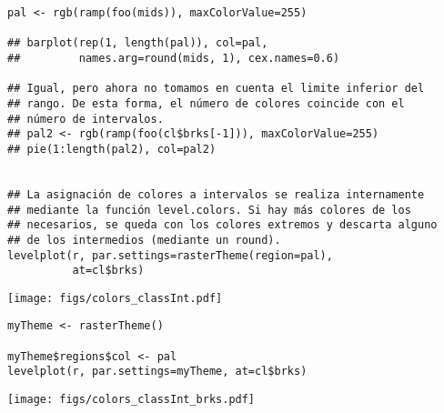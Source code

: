 \begin{lstlisting}
pal <- rgb(ramp(foo(mids)), maxColorValue=255)

## barplot(rep(1, length(pal)), col=pal,
##         names.arg=round(mids, 1), cex.names=0.6)

## Igual, pero ahora no tomamos en cuenta el limite inferior del
## rango. De esta forma, el número de colores coincide con el
## número de intervalos.
## pal2 <- rgb(ramp(foo(cl$brks[-1])), maxColorValue=255)
## pie(1:length(pal2), col=pal2)


## La asignación de colores a intervalos se realiza internamente
## mediante la función level.colors. Si hay más colores de los
## necesarios, se queda con los colores extremos y descarta alguno
## de los intermedios (mediante un round).
levelplot(r, par.settings=rasterTheme(region=pal),
          at=cl$brks)
\end{lstlisting}

\texttt{[image: figs/colors\_classInt.pdf]}





\lstset{language=R}
\begin{lstlisting}
myTheme <- rasterTheme()

myTheme$regions$col <- pal
levelplot(r, par.settings=myTheme, at=cl$brks)
\end{lstlisting}

\texttt{[image: figs/colors\_classInt\_brks.pdf]}

